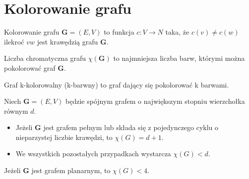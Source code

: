 	\section{Kolorowanie grafu}		
	 \begin{df} 
		 	Kolorowanie grafu $\mathbf{G} = (E,V)$  to funkcja $c:V\rightarrow N$ taka, że 
		 	$c(v) \neq c(w)$ ilekroć $vw$ jest krawędzią grafu $\mathbf{G}$.
	 \end{df}
	 
	 \begin{df}
		 	Liczba chromatyczna grafu $\chi (\mathbf{G}) $ to najmniejsza liczba barw,
		 	którymi można pokolorować graf $\mathbf{G}$.
	 \end{df}
	 
	 \begin{df}
		 	Graf k-kolorowalny (k-barwny) to graf dający się pokolorować k barwami.
	 \end{df}
		 		
	\begin{tw}[Tw. Brooksa] 
    	Niech $\mathbf{G} = (E,V)$ będzie spójnym grafem o największym stopniu
    	wierzchołka równym $d$. 
    	\begin{itemize}
    		\item Jeżeli $\mathbf{G}$ jest grafem pełnym lub składa się z
    		pojedynczego cyklu o nieparzystej liczbie krawędzi, to $\chi(G) = d + 1$.
    		\item We wszystkich pozostałych przypadkach wystarcza $\chi(G) < d$.
    	\end{itemize}
	\end{tw}
	
	\begin{tw}
    	Jeżeli $\mathbf{G}$ jest grafem planarnym, to $\chi(G) < 4$.
	\end{tw}